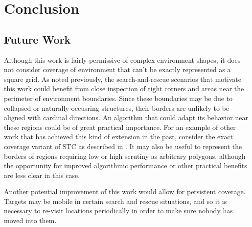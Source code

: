 \chapter{Conclusion}

\section{Future Work}

Although this work is fairly permissive of complex environment shapes, it does not consider coverage of environment that can't be exactly represented as a square grid. As noted previously, the search-and-rescue scenarios that motivate this work could benefit from close inspection of tight corners and areas near the perimeter of environment boundaries. Since these boundaries may be due to collapsed or naturally occusring structures, their borders are unlikely to be aligned with cardinal directions. An algorithm that could adapt its behavior near these regions could be of great practical importance. For an example of other work that has achieved this kind of extension in the past, consider the exact coverage variant of STC as described in \cite{STC}. It may also be useful to represent the borders of regions requiring low or high scrutiny as arbitrary polygons, although the opportunity for improved algorithmic performance or other practical benefits are less clear in this case.

Another potential improvement of this work would allow for persistent coverage. Targets may be mobile in certain search and rescue situations, and so it is necessary to re-visit locations periodically in order to make sure nobody has moved into them. %